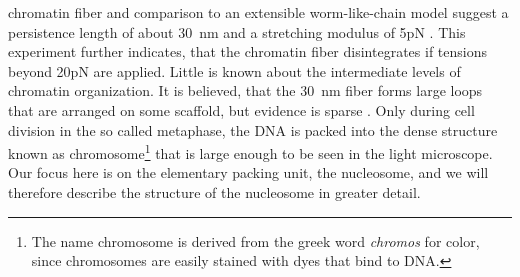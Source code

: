 chromatin fiber and comparison to an extensible worm-like-chain model suggest a persistence length 
of about 30~nm and a stretching modulus of 5pN \cite{Cui_PNAS_00}. This experiment further indicates, that 
the chromatin fiber disintegrates if tensions beyond 20pN are applied. 
Little is known about the intermediate levels of chromatin organization. It is believed, that the 30~nm fiber
forms large loops that are arranged on some scaffold, but evidence is sparse \cite{Alberts_02}. 
Only during cell division in the so called metaphase,  the DNA is packed into the dense structure known 
as chromosome\footnote{The name chromosome is derived from the greek word \emph{chromos} for 
color, since chromosomes are easily stained with dyes that bind to DNA.} that is large enough to be seen in
the light microscope. Our focus here is on the elementary packing unit, the nucleosome, and we will 
therefore describe the structure of the nucleosome in greater detail.

